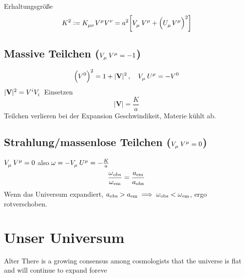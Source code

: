 \documentclass[10pt,oneside,a4paper]{scrartcl}
\let\originalleft\left  %
\let\originalright\right
\renewcommand{\left}{\mathopen{}\mathclose\bgroup\originalleft}
\renewcommand{\right}{\aftergroup\egroup\originalright}
\renewcommand{\vec}{\mathbf}
\theoremstyle{definition}
\theoremstyle{remark}
\begin{document}
Erhaltungsgröße
\begin{equation}
K^2:=\tensor{K}{_\mu_\nu}\tensor{V}{^\mu}\tensor{V}{^\nu}=a^2\left[\tensor{V}{_\mu}\tensor{V}{^\mu}
+\left(\tensor{U}{_\mu}\tensor{V}{^\mu}\right)^2\right]
\end{equation}
\subsection{Massive Teilchen ($\tensor{V}{_\mu}\tensor{V}{^\mu}=-1$)}
\begin{equation}
\left(V^0\right)^2=1+|\vec{V}|^2\,,\quad\tensor{V}{_\mu}\tensor{U}{^\mu}=-V^0
\end{equation}
$|\vec{V}|^2=\tensor{V}{^i}\tensor{V}{_i}$
Einsetzen
\begin{equation}
|\vec{V}|=\frac{K}{a}
\end{equation}
Teilchen verlieren bei der Expansion Geschwindikeit, Materie kühlt ab.
\subsection{Strahlung/massenlose Teilchen
($\tensor{V}{_\mu}\tensor{V}{^\mu}=0$)} $\tensor{V}{_\mu}\tensor{V}{^\mu}=0$ also
$\omega=-\tensor{V}{_\mu}\tensor{U}{^\mu}=-\frac{K}{a}$
\begin{equation}
\frac{\omega\textsubscript{obs}}{\omega\textsubscript{em}}
=\frac{a\textsubscript{em}}{a\textsubscript{obs}}
\end{equation}
Wenn das Universum expandiert,
$a\textsubscript{obs}>a\textsubscript{em}\implies\omega\textsubscript{obs}<\omega\textsubscript{em}$,
ergo rotverschoben.
\section{Unser Universum}
Alter
There is a growing consensus among cosmologists that the universe is flat and
will continue to expand foreve
\end{document}
